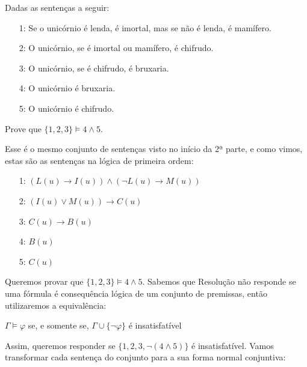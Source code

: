 \begin{rexercises} 
    \begin{question}
        Dadas as sentenças a seguir:
        \begin{enumerate}
            \item[1:] Se o unicórnio é lenda, é imortal, mas se não é lenda, é mamífero.
            \item[2:] O unicórnio, se é imortal ou mamífero, é chifrudo.
            \item[3:] O unicórnio, se é chifrudo, é bruxaria.
            \item[4:] O unicórnio é bruxaria.
            \item[5:] O unicórnio é chifrudo.
        \end{enumerate}
        Prove que $\{1, 2, 3\} \vDash 4 \land 5$.
        \begin{resolution}
            Esse é o mesmo conjunto de sentenças visto no início da 2ª parte, e como vimos, estas são as sentenças na lógica de primeira ordem:
            \begin{enumerate}
                \item[1:] $(L(u) \rightarrow I(u)) \land (\neg L(u) \rightarrow M(u))$ 
                \item[2:] $(I(u) \lor M(u)) \rightarrow C(u)$
                \item[3:] $C(u) \rightarrow B(u)$
                \item[4:] $B(u)$
                \item[5:] $C(u)$
            \end{enumerate} 
        
            Queremos provar que $\{1, 2, 3\} \vDash 4 \land 5$. Sabemos que Resolução não responde se uma fórmula é consequência lógica de um conjunto de premissas, então utilizaremos a equivalência:
            \begin{center}
                $\Gamma \vDash \varphi$ se, e somente se, $\Gamma \cup \{\neg \varphi\}$ é insatisfatível
            \end{center}
            Assim, queremos responder se $\{1, 2, 3, \neg (4 \land 5)\}$ é insatisfatível. Vamos transformar cada sentença do conjunto para a sua forma normal conjuntiva:


\end{resolution}
\end{question}
\end{rexercises}
